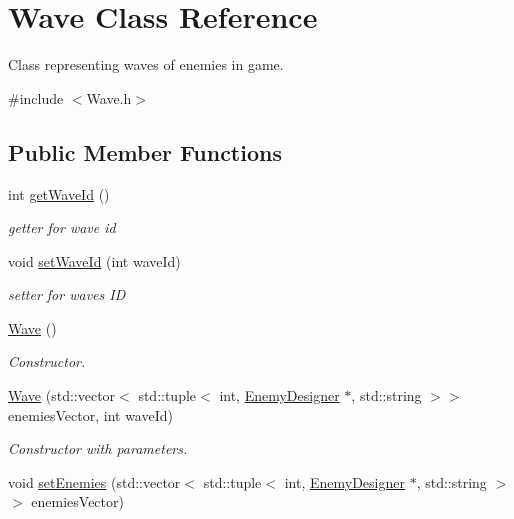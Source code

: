 \hypertarget{class_wave}{}\section{Wave Class Reference}
\label{class_wave}


Class representing waves of enemies in game.  




{\ttfamily \#include $<$Wave.\+h$>$}

\subsection*{Public Member Functions}
\begin{DoxyCompactItemize}
\item 
\mbox{\label{class_wave_a6fb7dde8fde8d5b67d49f6cbefcecd6b}} 
int \mbox{\hyperlink{class_wave_a6fb7dde8fde8d5b67d49f6cbefcecd6b}{get\+Wave\+Id}} ()
\begin{DoxyCompactList}\small\item\em getter for wave id \end{DoxyCompactList}\item 
void \mbox{\hyperlink{class_wave_a27e3aec3e19fc4f4cbfdf3eb486062c0}{set\+Wave\+Id}} (int wave\+Id)
\begin{DoxyCompactList}\small\item\em setter for wave\textquotesingle{}s ID \end{DoxyCompactList}\item 
\mbox{\label{class_wave_a3d8144ec0d6c0b0ede77ff59f54471aa}} 
\mbox{\hyperlink{class_wave_a3d8144ec0d6c0b0ede77ff59f54471aa}{Wave}} ()
\begin{DoxyCompactList}\small\item\em Constructor. \end{DoxyCompactList}\item 
\mbox{\hyperlink{class_wave_afbe28f8ee2238a9ead6aec5da1969618}{Wave}} (std\+::vector$<$ std\+::tuple$<$ int, \mbox{\hyperlink{class_enemy_designer}{Enemy\+Designer}} $\ast$, std\+::string $>$$>$ enemies\+Vector, int wave\+Id)
\begin{DoxyCompactList}\small\item\em Constructor with parameters. \end{DoxyCompactList}\item 
void \mbox{\hyperlink{class_wave_a78681a9dac7ede8d160be13c4027e9fd}{set\+Enemies}} (std\+::vector$<$ std\+::tuple$<$ int, \mbox{\hyperlink{class_enemy_designer}{Enemy\+Designer}} $\ast$, std\+::string $>$$>$ enemies\+Vector)

\end{DoxyCompactItemize}

